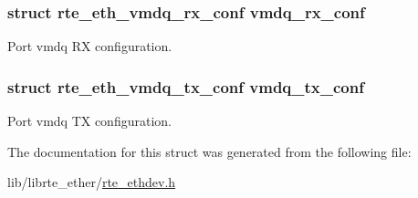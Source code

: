 \subsubsection[{vmdq\+\_\+rx\+\_\+conf}]{\setlength{\rightskip}{0pt plus 5cm}struct rte\+\_\+eth\+\_\+vmdq\+\_\+rx\+\_\+conf vmdq\+\_\+rx\+\_\+conf}\label{structrte__eth__conf_a17845d02c4ddfdc09982bd899b6df06e}
Port vmdq R\+X configuration. \hypertarget{structrte__eth__conf_afac8cacc119c6d4e8fcae2c982b72b97}{}
\subsubsection[{vmdq\+\_\+tx\+\_\+conf}]{\setlength{\rightskip}{0pt plus 5cm}struct rte\+\_\+eth\+\_\+vmdq\+\_\+tx\+\_\+conf vmdq\+\_\+tx\+\_\+conf}\label{structrte__eth__conf_afac8cacc119c6d4e8fcae2c982b72b97}
Port vmdq T\+X configuration. 

The documentation for this struct was generated from the following file\+:\begin{DoxyCompactItemize}
\item 
lib/librte\+\_\+ether/\hyperlink{rte__ethdev_8h}{rte\+\_\+ethdev.\+h}\end{DoxyCompactItemize}
